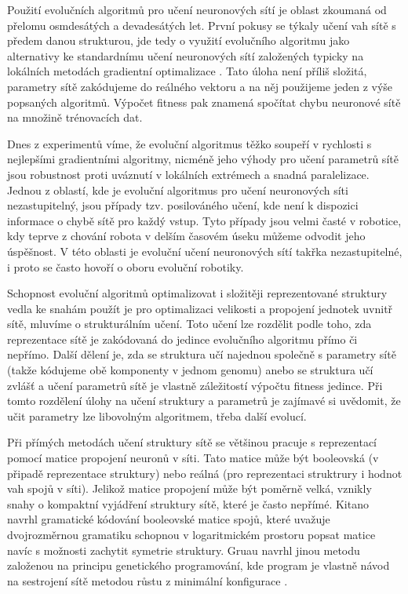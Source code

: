 Použití evolučních algoritmů pro učení neuronových sítí je oblast zkoumaná od přelomu osmdesátých a devadesátých let. První pokusy se týkaly učení vah sítě s předem danou strukturou, jde tedy o využití evolučního algoritmu jako alternativy ke standardnímu učení neuronových sítí založených typicky na lokálních metodách gradientní optimalizace \cite{neuro}. 
Tato úloha není příliš složitá, parametry sítě zakódujeme do reálného vektoru a na něj použijeme jeden z výše popsaných algoritmů. Výpočet fitness pak znamená spočítat chybu neuronové sítě na množině trénovacích dat.

Dnes z experimentů víme, že evoluční algoritmus těžko soupeří v rychlosti s nejlepšími gradientními algoritmy, nicméně jeho výhody pro učení parametrů sítě jsou robustnost proti uváznutí v lokálních extrémech a snadná paralelizace. Jednou z oblastí, kde je evoluční algoritmus pro učení neuronových síti nezastupitelný, jsou případy tzv. posilováného učení, kde není k dispozici informace o chybě sítě pro každý vstup. Tyto případy jsou velmi časté v robotice, kdy teprve z chování robota v delším časovém úseku můžeme odvodit jeho úspěšnost. V této oblasti je evoluční učení neuronových sítí takřka nezastupitelné, i proto se často hovoří o oboru evoluční robotiky. 

Schopnost evoluční algoritmů optimalizovat i složitěji reprezentované struktury vedla ke snahám použít je pro optimalizaci velikosti a propojení jednotek uvnitř sítě, mluvíme o strukturálním učení. Toto učení lze rozdělit podle toho, zda reprezentace sítě je zakódovaná do jedince evolučního algoritmu přímo či nepřímo. Další dělení je, zda se struktura učí najednou společně s parametry sítě (takže kódujeme obě komponenty v jednom genomu) anebo se struktura učí zvlášť a učení parametrů sítě je vlastně záležitostí výpočtu fitness jedince. Při tomto rozdělení úlohy na učení struktury a parametrů je zajímavé si uvědomit, že učit parametry lze libovolným algoritmem, třeba další evolucí.

Při přímých metodách učení struktury sítě se většinou pracuje s reprezentací pomocí matice propojení neuronů v síti. Tato matice může být booleovská (v připadě reprezentace struktury) nebo reálná (pro reprezentaci struktrury i hodnot vah spojů v síti). Jelikož matice propojení může být poměrně velká, vznikly snahy o kompaktní vyjádření struktury sítě, které je často nepřímé. Kitano navrhl gramatické kódování booleovské matice spojů, které uvažuje dvojrozměrnou gramatiku schopnou v logaritmickém prostoru popsat matice navíc s možnosti zachytit symetrie struktury. Gruau navrhl jinou metodu založenou na principu genetického programování, kde program je vlastně návod na sestrojení sítě metodou růstu z minimální konfigurace \cite{gruau}. 

